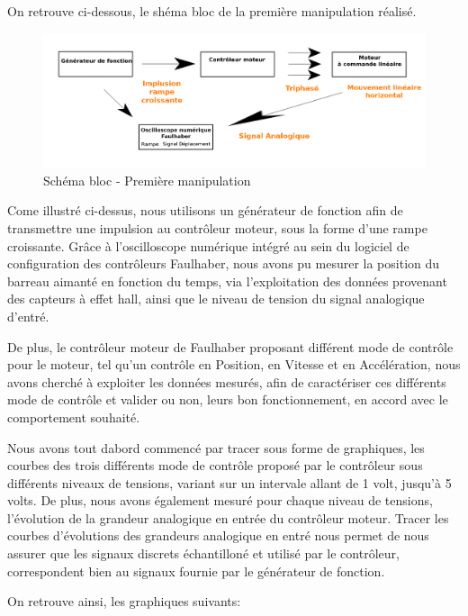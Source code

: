 \documentclass[french,a4paper,12pt]{report}
\begin{document}
	On retrouve ci-dessous, le shéma bloc de la première manipulation réalisé.
		
	\begin{figure}[!ht]
    \center
  	\includegraphics[width=18cm]{manip1.png}
    \caption{Schéma bloc - Première manipulation}
	\end{figure}	
		
		Come illustré ci-dessus, nous utilisons un générateur de fonction afin de transmettre une impulsion au contrôleur moteur, sous la forme d'une rampe croissante.
		Grâce à l'oscilloscope numérique intégré au sein du logiciel de configuration des contrôleurs Faulhaber, nous avons pu mesurer la position du barreau aimanté en fonction du temps, via l'exploitation des données provenant des capteurs à effet hall, ainsi que le niveau de tension du signal analogique d'entré.
		
		De plus, le contrôleur moteur de Faulhaber proposant différent mode de contrôle pour le moteur, tel qu'un contrôle en Position, en Vitesse et en Accélération, nous avons cherché à exploiter les données mesurés, afin de caractériser ces différents mode de contrôle et valider ou non, leurs bon fonctionnement, en accord avec le comportement souhaité.
		
		Nous avons tout dabord commencé par tracer sous forme de graphiques, les courbes des trois différents mode de contrôle proposé par le contrôleur sous différents niveaux de tensions, variant sur un intervale allant de 1 volt, jusqu'à 5 volts.
		De plus, nous avons également mesuré pour chaque niveau de tensions, l'évolution de la grandeur analogique en entrée du contrôleur moteur. Tracer les courbes d'évolutions des grandeurs analogique en entré nous permet de nous assurer que les signaux discrets échantilloné et utilisé par le contrôleur, correspondent bien au signaux fournie par le générateur de fonction.
		
		On retrouve ainsi, les graphiques suivants:
		
\end{document}
